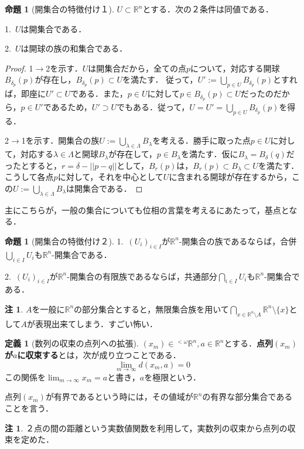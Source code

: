 \documentclass[uplatex, 12pt, dvipdfmx]{jsreport}
\theoremstyle{definition}
\newtheorem{proposition}[theorem]{命題}
\newtheorem{definition}[theorem]{定義}
\newtheorem{remark}[theorem]{注}
\theoremstyle{StatementsWithStar}
\theoremstyle{StatementsWithStar2}
\theoremstyle{StatementsWithStar3}
\theoremstyle{StatementsWithCCirc}
\theoremstyle{definition}
\begin{document}
\begin{proposition}[開集合の特徴付け１]\rm{}
    $U\subset\mathbb{R}^n$とする．次の２条件は同値である．

    1.\, $U$は開集合である．

    2.\, $U$は開球の族の和集合である．
    
\end{proposition}
\begin{proof}
    1$\to$2を示す．$U$は開集合だから，全ての点$p$について，対応する開球$B_{\delta_p}(p)$が存在し，$B_{\delta_p}(p)\subset U$を満たす．
    従って，$U':=\bigcup_{p\in U}B_{\delta_p}(p)$とすれば，即座に$U'\subset U$である．また，$p\in U$に対して$p\in B_{\delta_p}(p)\subset U$だったのだから，$p\in U'$であるため，$U'\supset U$でもある．従って，$U=U'=\bigcup_{p\in U}B_{\delta_p}(p)$を得る．

    2$\to$1を示す．開集合の族$U:=\bigcup_{\lambda\in\Lambda}B_\lambda$を考える．勝手に取った点$p\in U$に対して，対応する$\lambda\in\Lambda$と開球$B_\lambda$が存在して，$p\in B_\lambda$を満たす．仮に$B_\lambda=B_{\delta}(q)$だったとすると，$r=\delta -||p-q||$として，$B_{r}(p)$は，$B_{r}(p)\subset B_\lambda\subset U$を満たす．
    こうして各点$p$に対して，それを中心として$U$に含まれる開球が存在するから，この$U:=\bigcup_{\lambda\in\Lambda}B_\lambda$は開集合である．
\end{proof}

主にこちらが，一般の集合についても位相の言葉を考えるにあたって，基点となる．
\begin{proposition}[開集合の特徴付け２]\rm{}

    1.\, $(U_i)_{i\in I}$が$\mathbb{R}^n$-開集合の族であるならば，合併$\bigcup_{i\in I}U_i$も$\mathbb{R}^n$-開集合である．

    2.\, $(U_i)_{i\in I}$が$\mathbb{R}^n$-開集合の有限族であるならば，共通部分$\bigcap_{i\in I}U_i$も$\mathbb{R}^n$-開集合である．
\end{proposition}
\begin{remark}
    $A$を一般に$\mathbb{R}^n$の部分集合とすると，無限集合族を用いて$\bigcap_{x\in\mathbb{R}^n\setminus A}\mathbb{R}^n\setminus\{x\}$として$A$が表現出来てしまう．すごい怖い．
\end{remark}

\begin{definition}[数列の収束の点列への拡張]
    $(x_m)\in{}^{<\omega}\mathbb{R}^n,a\in\mathbb{R}^n$とする．\textbf{点列$(x_m)$が$a$に収束する}とは，次が成り立つことである．
    \[ \lim_{m\to\infty}d(x_m,a)=0 \]
    この関係を$\lim_{m\to\infty}x_m=a$と書き，$a$を極限という．

    点列$(x_m)$が有界であるという時には，その値域が$\mathbb{R}^n$の有界な部分集合であることを言う．

\end{definition}
\begin{remark}
    ２点の間の距離という実数値関数を利用して，実数列の収束から点列の収束を定めた．
\end{remark}
\end{document}
